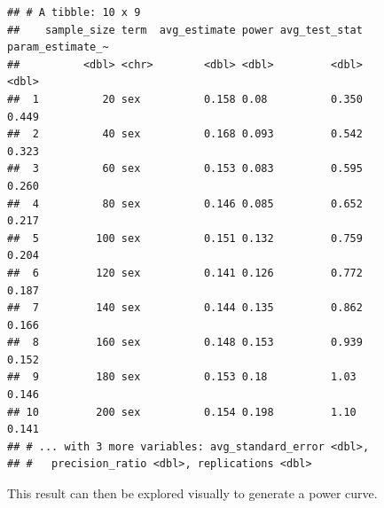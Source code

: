 \documentclass[man]{apa6}
\newenvironment{Shaded}{\begin{snugshade}}{\end{snugshade}}
\newcommand{\DataTypeTok}[1]{\textcolor[rgb]{0.13,0.29,0.53}{#1}}
\newcommand{\DecValTok}[1]{\textcolor[rgb]{0.00,0.00,0.81}{#1}}
\newcommand{\KeywordTok}[1]{\textcolor[rgb]{0.13,0.29,0.53}{\textbf{#1}}}
\newcommand{\NormalTok}[1]{#1}
\newcommand{\OperatorTok}[1]{\textcolor[rgb]{0.81,0.36,0.00}{\textbf{#1}}}
\newcommand{\StringTok}[1]{\textcolor[rgb]{0.31,0.60,0.02}{#1}}
\begin{document}
\begin{Shaded}
\end{Shaded}

\begin{verbatim}
## # A tibble: 10 x 9
##    sample_size term  avg_estimate power avg_test_stat param_estimate_~
##          <dbl> <chr>        <dbl> <dbl>         <dbl>            <dbl>
##  1          20 sex          0.158 0.08          0.350            0.449
##  2          40 sex          0.168 0.093         0.542            0.323
##  3          60 sex          0.153 0.083         0.595            0.260
##  4          80 sex          0.146 0.085         0.652            0.217
##  5         100 sex          0.151 0.132         0.759            0.204
##  6         120 sex          0.141 0.126         0.772            0.187
##  7         140 sex          0.144 0.135         0.862            0.166
##  8         160 sex          0.148 0.153         0.939            0.152
##  9         180 sex          0.153 0.18          1.03             0.146
## 10         200 sex          0.154 0.198         1.10             0.141
## # ... with 3 more variables: avg_standard_error <dbl>,
## #   precision_ratio <dbl>, replications <dbl>
\end{verbatim}

This result can then be explored visually to generate a power curve.
\end{document}
